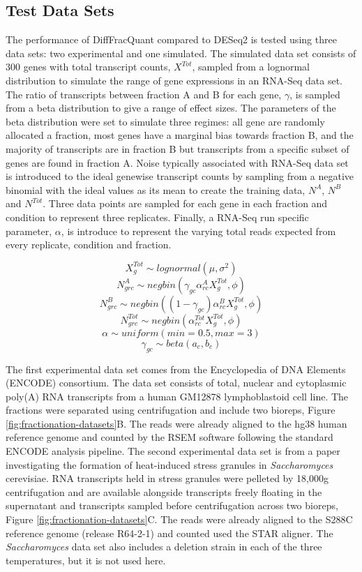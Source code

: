 \documentclass[../main.tex]{subfiles}
\begin{document}
\subsection{Test Data Sets}
The performance of DiffFracQuant compared to DESeq2 is tested using three data sets: two experimental and one simulated.
The simulated data set consists of 300 genes with total transcript counts, $X^{Tot}$, sampled from a lognormal distribution to simulate the range of gene expressions in an RNA-Seq data set.
The ratio of transcripts between fraction A and B for each gene, $\gamma$, is sampled from a beta distribution to give a range of effect sizes.
The parameters of the beta distribution were set to simulate three regimes: all gene are randomly allocated a fraction, most genes have a marginal bias towards fraction B, and the majority of transcripts are in fraction B but transcripts from a specific subset of genes are found in fraction A.
Noise typically associated with RNA-Seq data set is introduced to the ideal genewise transcript counts by sampling from a negative binomial with the ideal values as its mean to create the training data, $N^{A}$, $N^{B}$ and $N^{Tot}$.
Three data points are sampled for each gene in each fraction and condition to represent three replicates.
Finally, a RNA-Seq run specific parameter, $\alpha$, is introduce to represent the varying total reads expected from every replicate, condition and fraction.

$$X^{Tot}_g \sim lognormal(\mu, \sigma^2)$$
$$N^{A}_{grc} \sim negbin(\gamma_{gc}\alpha^{A}_{rc}X^{Tot}_g,\phi)$$
$$N^{B}_{grc} \sim negbin((1-\gamma_{gc})\alpha^{B}_{rc}X^{Tot}_g,\phi)$$
$$N^{Tot}_{grc} \sim negbin(\alpha^{Tot}_{rc}X^{Tot}_g,\phi)$$
$$\alpha \sim uniform(min=0.5, max=3)$$
$$\gamma_{gc}\sim beta(a_c,b_c)$$

The first experimental data set comes from the Encyclopedia of DNA Elements (ENCODE) consortium. 
The data set consists of total, nuclear and cytoplasmic poly(A) RNA transcripts from a human GM12878 lymphoblastoid cell line.
The fractions were separated using centrifugation and include two bioreps, Figure \ref{fig:fractionation-datasets}B.
The reads were already aligned to the hg38 human reference genome and counted by the RSEM software following the standard ENCODE analysis pipeline.
The second experimental data set is from a paper investigating the formation of heat-induced stress granules in \textit{Saccharomyces} cerevisiae.
RNA transcripts held in stress granules were pelleted by 18,000g centrifugation and are available alongside transcripts freely floating in the supernatant and transcripts sampled before centrifugation across two bioreps, Figure \ref{fig:fractionation-datasets}C.
The reads were already aligned to the S288C reference genome (release R64-2-1) and counted used the STAR aligner.
The \textit{Saccharomyces} data set also includes a deletion strain in each of the three temperatures, but it is not used here. 
\end{document}
